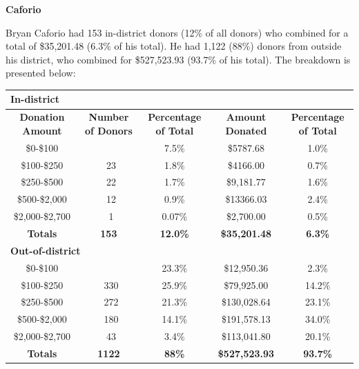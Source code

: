 \documentclass[10pt]{article}
\begin{document}
{\Large \bf{Caforio}}

Bryan Caforio had 153 in-district donors (12\% of all donors) who combined for a total of \$35,201.48 (6.3\% of his total). He had 1,122 (88\%) donors from outside his district, who combined for \$527,523.93 (93.7\% of his total). The breakdown is presented below:

\begin{table}[ht]
\begin{tabularx}{\textwidth}{c | c c | c c}
\multicolumn{5}{l}{\bf{In-district}} \\ \hline
 \bf{Donation Amount} & \bf{Number of Donors} & \bf{Percentage of Total} & \bf{Amount Donated} & \bf{Percentage of Total} \\ \hline
\enspace \enspace \enspace \$0-\$100 &\quad \quad \quad 95 & 7.5\% &\quad \quad  \$5787.68 & 1.0\%\\ \hline
\enspace \enspace \enspace \$100-\$250 &\quad \quad \quad \ 23 & 1.8\% &\quad \quad \$4166.00 & 0.7\% \\ \hline
\enspace \enspace \enspace \$250-\$500 &\quad \quad \quad \ 22 & 1.7\% &\quad \quad\$9,181.77 & 1.6\%\\ \hline
\enspace \enspace \enspace \$500-\$2,000 &\quad \quad \quad \ 12 & 0.9\% &\quad \quad \$13366.03 & 2.4\%\\ \hline
\enspace \enspace \enspace \$2,000-\$2,700 &\quad \quad \quad \ 1 & 0.07\% &\quad \quad \$2,700.00 & 0.5\% \\ \hline
\bf{Totals} & \quad \quad \quad \bf{153} & \bf{12.0\%} & \quad \quad \bf{\$35,201.48} & \bf{6.3\%} \\  
\hline \hline
\multicolumn{5}{l}{\bf{Out-of-district}} \\ \hline
\enspace \enspace \enspace \$0-\$100 &\quad \quad \quad 297 & 23.3\% &\quad \quad  \$12,950.36 & 2.3\%\\ \hline
\enspace \enspace \enspace \$100-\$250 &\quad \quad \quad \ 330 & 25.9\% &\quad \quad \$79,925.00 & 14.2\% \\ \hline
\enspace \enspace \enspace \$250-\$500 &\quad \quad \quad \ 272 & 21.3\% &\quad \quad\$130,028.64 & 23.1\%\\ \hline
\enspace \enspace \enspace \$500-\$2,000 &\quad \quad \quad \ 180 & 14.1\% &\quad \quad \$191,578.13 & 34.0\%\\ \hline
\enspace \enspace \enspace \$2,000-\$2,700 &\quad \quad \quad \ 43 & 3.4\% &\quad \quad \$113,041.80 & 20.1\% \\ \hline
\bf{Totals} & \quad \quad \quad \bf{1122} & \bf{88\%} & \quad \quad \bf{\$527,523.93} & \bf{93.7\%}\\  

\end{tabularx}
\end{table}
\end{document}

